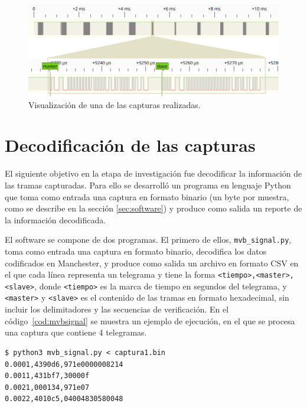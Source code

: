 \begin{figure}[htbp!]
	\centering
    \includegraphics[width=\textwidth]{./Figures/pulseview.png}
    \caption{Visualización de una de las capturas realizadas.}
    \label{fig:pulseview}
\end{figure}

\section{Decodificación de las capturas}
\label{sec:decodificacion}

El siguiente objetivo en la etapa de investigación fue decodificar la información de las tramas capturadas. Para ello se desarrolló un programa en lenguaje Python que toma como entrada una captura en formato binario (un byte por muestra, como se describe en la sección \ref{sec:software}) y produce como salida un reporte de la información decodificada.

El software se compone de dos programas. El primero de ellos, \texttt{mvb\_signal.py}, toma como entrada una captura en formato binario, decodifica los datos codificados en Manchester, y produce como salida un archivo en formato CSV en el que cada línea representa un telegrama y tiene la forma \texttt{<tiempo>,\allowbreak <master>,\allowbreak <slave>}, donde \texttt{<tiempo>} es la marca de tiempo en segundos del telegrama, y \texttt{<master>} y \texttt{<slave>} es el contenido de las tramas en formato hexadecimal, sin incluir los delimitadores y las secuencias de verificación. En el código~\ref{cod:mvbsignal} se muestra un ejemplo de ejecución, en el que se procesa una captura que contiene 4 telegramas.

\begin{lstlisting}[label=cod:mvbsignal,caption=Ejemplo de ejecución de \texttt{mvb\_signal.py}.,float=htbp]
$ python3 mvb_signal.py < captura1.bin
0.0001,4390d6,971e0000008214
0.0011,431bf7,30000f
0.0021,000134,971e07
0.0022,4010c5,04004830580048
\end{lstlisting}

